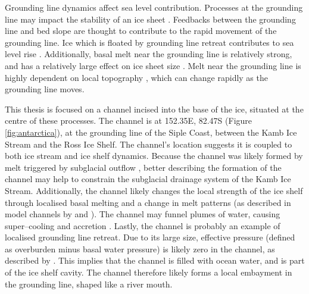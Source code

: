 Grounding line dynamics affect sea level contribution.  Processes at the grounding line may impact the stability of an ice sheet \citep{weertman1974stability}. Feedbacks between the grounding line and bed slope are thought to contribute to the rapid movement of the grounding line. Ice which is floated by grounding line retreat contributes to sea level rise \citep{dowdeswell2020delicate,dupont2005assessment}. Additionally, basal melt near the grounding line is relatively strong, \citep{rignot2013ice,goldberg2019accurately} and has a relatively large effect on ice sheet size \citep{robel2022layered}. Melt near the grounding line is highly dependent on local topography \citep{rignot2013ice,goldberg2019accurately}, which can change rapidly as the grounding line moves.

This thesis is focused on a channel incised into the base of the ice, situated at the centre of these processes. The channel is at 152.35\textdegree E, 82.47\textdegree  S (Figure \ref{fig:antarctica}), at the grounding line of the Siple Coast, between the Kamb Ice Stream and the Ross Ice Shelf. The channel's location suggests it is coupled to both ice stream and ice shelf dynamics.
Because the channel was likely formed by melt triggered by subglacial outflow \citep{kim2016active,alley2016impacts}, better describing the formation of the channel may help to constrain the subglacial drainage system of the Kamb Ice Stream. 
Additionally, the channel likely changes the local strength of the ice shelf through localised basal melting and a change in melt patterns (as described in model channels by \cite{gladish2012ice} and \cite{sergienko2013basal}). The channel may funnel plumes of water, causing super--cooling and accretion \citep{holland2006effects}.
Lastly, the channel is probably an example of localised grounding line retreat. Due to its large size, effective pressure (defined as overburden
minus basal water pressure) is likely zero in the channel, as described by \cite{drews2015evolution}. This implies that the channel is filled with ocean water, and is part of the ice shelf cavity. The channel therefore likely forms a local embayment in the grounding line, shaped like a river mouth.


